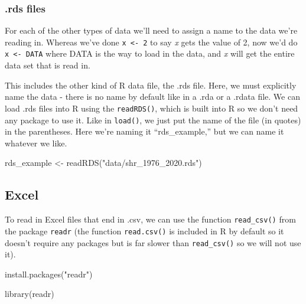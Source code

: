 \documentclass[
  a4paper,
]{krantz}
\makeatletter
\newenvironment{Shaded}{\begin{snugshade}}{\end{snugshade}}
\newcommand{\FunctionTok}[1]{\textcolor[rgb]{0,0,0}{#1}}
\newcommand{\NormalTok}[1]{#1}
\newcommand{\OtherTok}[1]{\textcolor[rgb]{0.37,0.37,0.37}{#1}}
\newcommand{\StringTok}[1]{\textcolor[rgb]{0.5,0.5,0.5}{#1}}
\newenvironment{kframe}{%
\medskip{}
\setlength{\fboxsep}{.8em}
 \def\at@end@of@kframe{}%
 \ifinner\ifhmode%
  \def\at@end@of@kframe{\end{minipage}}%
  \begin{minipage}{\columnwidth}%
 \fi\fi%
 \def\FrameCommand##1{\hskip\@totalleftmargin \hskip-\fboxsep
 \colorbox{shadecolor}{##1}\hskip-\fboxsep
     \hskip-\linewidth \hskip-\@totalleftmargin \hskip\columnwidth}%
 \MakeFramed {\advance\hsize-\width
   \@totalleftmargin\z@ \linewidth\hsize
   \@setminipage}}%
 {\par\unskip\endMakeFramed%
 \at@end@of@kframe}
\renewenvironment{Shaded}{\begin{kframe}}{\end{kframe}}
\makeatother
\begin{document}
\hypertarget{rds-files}{%
\subsubsection{.rds files}\label{rds-files}}

For each of the other types of data we'll need to assign a
name to the data we're reading in. Whereas we've done
\texttt{x\ \textless{}-\ 2} to say \emph{x} gets the value
of 2, now we'd do \texttt{x\ \textless{}-\ DATA} where DATA
is the way to load in the data, and \emph{x} will get the
entire data set that is read in.

This includes the other kind of R data file, the .rds file.
Here, we must explicitly name the data - there is no name by
default like in a .rda or a .rdata file. We can load .rds
files into R using the \texttt{readRDS()}, which is built
into R so we don't need any package to use it. Like in
\texttt{load()}, we just put the name of the file (in
quotes) in the parentheses. Here we're naming it
``rds\_example,'' but we can name it whatever we like.

\begin{Shaded}
\begin{Highlighting}[]
\NormalTok{rds\_example }\OtherTok{\textless{}{-}} \FunctionTok{readRDS}\NormalTok{(}\StringTok{"data/shr\_1976\_2020.rds"}\NormalTok{)}
\end{Highlighting}
\end{Shaded}

\hypertarget{excel}{%
\subsection{Excel}\label{excel}}

To read in Excel files that end in .csv, we can use the
function \texttt{read\_csv()} from the package
\texttt{readr} (the function \texttt{read.csv()} is included
in R by default so it doesn't require any packages but is
far slower than \texttt{read\_csv()} so we will not use it).

\begin{Shaded}
\begin{Highlighting}[]
\FunctionTok{install.packages}\NormalTok{(}\StringTok{"readr"}\NormalTok{)}
\end{Highlighting}
\end{Shaded}

\begin{Shaded}
\begin{Highlighting}[]
\FunctionTok{library}\NormalTok{(readr)}
\end{Highlighting}
\end{Shaded}
\end{document}

